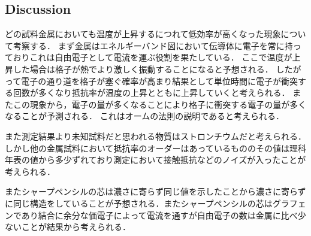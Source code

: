 \documentclass[11pt, a4paper,twocolumn]{jarticle}
\begin{document}
\subsection{Discussion}
どの試料金属においても温度が上昇するにつれて低効率が高くなった現象について考察する．
まず金属はエネルギーバンド図において伝導体に電子を常に持っておりこれは自由電子として電流を運ぶ役割を果たしている．
ここで温度が上昇した場合は格子が熱でより激しく振動することになると予想される．
したがって電子の通り道を格子が塞ぐ確率が高まり結果として単位時間に電子が衝突する回数が多くなり抵抗率が温度の上昇とともに上昇していくと考えられる．
またこの現象から，電子の量が多くなることにより格子に衝突する電子の量が多くなることが予測される．
これはオームの法則の説明であると考えられる．

また測定結果より未知試料だと思われる物質はストロンチウムだと考えられる．
しかし他の金属試料において抵抗率のオーダーはあっているもののその値は理科年表の値から多少ずれており測定において接触抵抗などのノイズが入ったことが考えられる．

またシャープペンシルの芯は濃さに寄らず同じ値を示したことから濃さに寄らずに同じ構造をしていることが予想される．またシャープペンシルの芯はグラフェンであり結合に余分な価電子によって電流を通すが自由電子の数は金属に比べ少ないことが結果から考えられる．
\newpage
\end{document}
